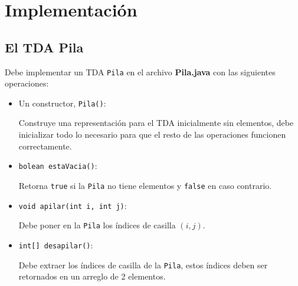 \documentclass[dcc]{fcfmcourse}
\begin{document}
\section{Implementación}
\subsection{El TDA Pila}
Debe implementar un TDA \texttt{Pila} en el archivo \textbf{Pila.java} con las siguientes operaciones:

\begin{itemize}

\item Un constructor, \texttt{Pila()}:

Construye una representación para el TDA inicialmente sin elementos, debe inicializar todo lo necesario para que el resto de las operaciones funcionen correctamente.

\item \texttt{bolean estaVacia()}:

Retorna \texttt{true} si la \texttt{Pila} no tiene elementos y \texttt{false} en caso contrario.

\item \texttt{void apilar(int i, int j)}:

Debe poner en la \texttt{Pila} los índices de casilla $(i,j)$.

\item \texttt{int[] desapilar()}:

Debe extraer los índices de casilla de la \texttt{Pila}, estos índices deben ser retornados en un arreglo de 2 elementos.

\end{itemize}
\end{document}
